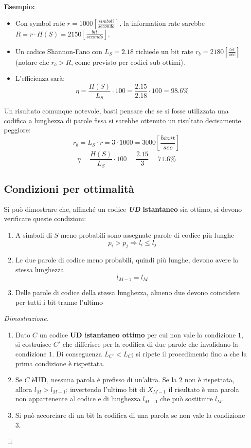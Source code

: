 \textbf{Esempio:}

\begin{itemize}
    \item Con symbol rate $r=1000[\frac{simboli}{secondo}]$, la information rate sarebbe $R=r\cdot H(S) = 2150[\frac{bit}{secondo}]$.
    \item Un codice Shannon-Fano con $L_S=2.18$ richiede un bit rate $r_b= 2180 [\frac{bit}{sec}]$ (notare che $r_b > R$, come previsto per codici sub-ottimi).
    \item L'efficienza sarà:
    \[\eta = \frac{H(S)}{L_S} \cdot 100 = \frac{2.15}{2.18} \cdot 100 = 98.6\%\]
\end{itemize}

Un risultato comunque notevole, basti pensare che se si fosse utilizzata una codifica a lunghezza di parole fissa si sarebbe ottenuto un risultato decisamente peggiore:
\[r_b = L_S \cdot r = 3 \cdot 1000 = 3000\left[\frac{binit}{sec}\right]\]
\[\eta = \frac{H(S)}{L_S} \cdot 100 = \frac{2.15}{3} = 71.6\%\]

\subsection{Condizioni per ottimalità}
Si può dimostrare che, affinché un codice \textbf{\textit{UD} istantaneo} sia ottimo, si devono verificare queste condizioni:
\begin{enumerate}
    \item A simboli di $S$ meno probabili sono assegnate parole di codice più lunghe
    \[p_i > p_j \Rightarrow l_i \leq l_j\]
    \item Le due parole di codice meno probabili, quindi più lunghe, devono avere la stessa lunghezza
    \[l_{M-1} = l_M\]
    \item Delle parole di codice della stessa lunghezza, almeno due devono coincidere per tutti i bit tranne l'ultimo 
\end{enumerate}

\begin{proof}[Dimostrazione]
\begin{enumerate}
    \item Dato $C$ un codice \textbf{UD istantaneo ottimo} per cui non vale la condizione $1$, si costruisce $C'$ che differisce per la codifica di due parole che invalidano la condizione $1$. Di conseguenza $L_{C'} < L_C$; si ripete il procedimento fino a che la prima condizione è rispettata.
    \item Se $C$ è\textbf{UD}, nessuna parola è prefisso di un'altra. Se la $2$ non è rispettata, allora $l_M > l_{M-1}$; invertendo l'ultimo bit di $X_{M-1}$ il risultato è una parola non appartenente al codice e di lunghezza $l_{M-1}$ che può sostituire $l_{M}$.
    \item Si può accorciare di un bit la codifica di una parola se non vale la condizione $3$. 
\end{enumerate}
    
\end{proof}


